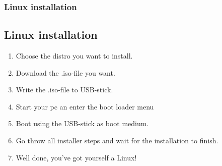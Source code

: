 \begin{frame}
	\frametitle{Linux installation}
	\subsection{Linux installation}
	
	\begin{enumerate}
		\item Choose the distro you want to install.
		\item Download the .iso-file you want.
		\item Write the .iso-file to USB-stick.
		\item Start your pc an enter the boot loader menu
		\item Boot using the USB-stick as boot medium.
		\item Go throw all installer steps and wait for the installation to finish.
		\item Well done, you've got yourself a Linux!
	\end{enumerate}
\end{frame}
